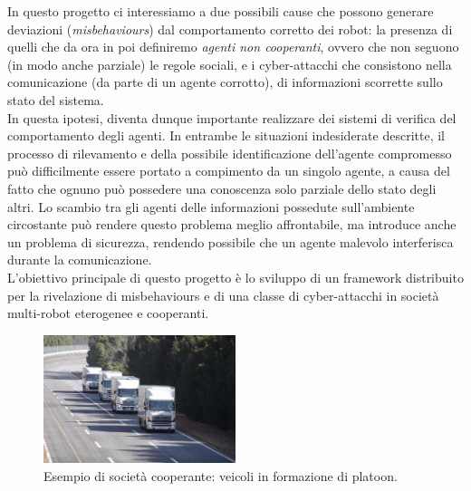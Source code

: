 \documentclass[paper=a4, fontsize=11pt]{scrartcl} %
\numberwithin{equation}{section} %
\numberwithin{table}{section} %
\begin{document}
In questo progetto ci interessiamo a due possibili cause che possono generare
deviazioni (\textit{misbehaviours}) dal comportamento corretto dei robot: la presenza di quelli che 
da ora in poi definiremo \textit{agenti non cooperanti}, ovvero che non seguono (in modo anche parziale) le regole sociali, e
i cyber-attacchi che consistono nella comunicazione (da parte di un agente corrotto), di informazioni scorrette sullo stato del sistema. \\

In questa ipotesi, diventa dunque importante realizzare dei
sistemi di verifica del comportamento degli agenti. In entrambe le situazioni indesiderate descritte, il processo di rilevamento e della possibile identificazione dell'agente compromesso può difficilmente essere portato a compimento da un singolo agente, a causa del fatto che ognuno può possedere una conoscenza solo parziale dello stato degli altri.
Lo scambio tra gli agenti delle informazioni possedute sull'ambiente circostante può rendere questo problema meglio affrontabile, ma introduce
anche un problema di sicurezza, rendendo possibile che un agente malevolo 
interferisca durante la comunicazione. \\

L'obiettivo principale di questo progetto è 
lo sviluppo di un framework distribuito per la rivelazione di misbehaviours
e di una classe di cyber-attacchi in società multi-robot eterogenee e cooperanti.

\begin{figure}[ht]
\centering
\includegraphics[width=0.5\textwidth]{platoon}
\caption{Esempio di società cooperante: veicoli in formazione di platoon.}
\label{img:platoon}
\end{figure}



\end{document}
